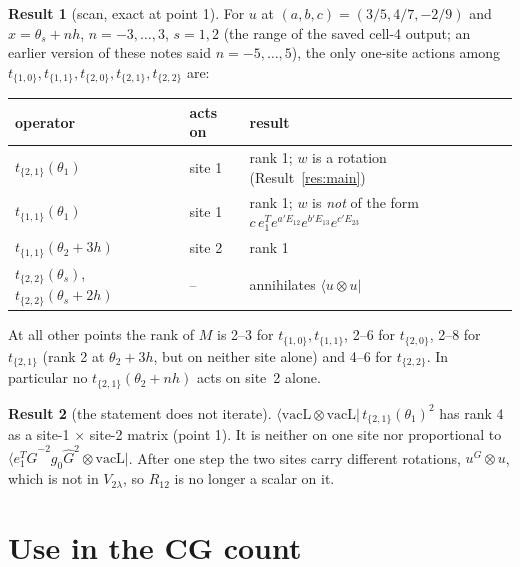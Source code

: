 \documentclass[11pt]{article}
\theoremstyle{definition}
\newtheorem{result}{Result}
\theoremstyle{remark}
\begin{document}
\begin{result}[scan, exact at point 1]\label{res:scan}
For $u$ at $(a,b,c)=(3/5,4/7,-2/9)$ and $x=\theta_s+nh$, $n=-3,\dots,3$, $s=1,2$ (the range of the saved cell-4 output; an earlier version of these notes said $n=-5,\dots,5$), the only one-site actions among $t_{\{1,0\}},t_{\{1,1\}},t_{\{2,0\}},t_{\{2,1\}},t_{\{2,2\}}$ are:
\begin{center}
\begin{tabular}{lll}\toprule
operator & acts on & result\\\midrule
$t_{\{2,1\}}(\theta_1)$ & site 1 & rank 1; $w$ is a rotation (Result~\ref{res:main})\\
$t_{\{1,1\}}(\theta_1)$ & site 1 & rank 1; $w$ is \emph{not} of the form $c\,e_1^Te^{a'E_{12}}e^{b'E_{13}}e^{c'E_{23}}$\\
$t_{\{1,1\}}(\theta_2+3h)$ & site 2 & rank 1\\
$t_{\{2,2\}}(\theta_s)$, $t_{\{2,2\}}(\theta_s+2h)$ & -- & annihilates $\langle u\otimes u|$\\\bottomrule
\end{tabular}
\end{center}
At all other points the rank of $M$ is 2--3 for $t_{\{1,0\}},t_{\{1,1\}}$, 2--6 for $t_{\{2,0\}}$, 2--8 for $t_{\{2,1\}}$ (rank 2 at $\theta_2+3h$, but on neither site alone) and 4--6 for $t_{\{2,2\}}$. In particular no $t_{\{2,1\}}(\theta_2+nh)$ acts on site~2 alone.
\end{result}

\begin{result}[the statement does not iterate]\label{res:iter}
$\langle\mathrm{vacL}\otimes\mathrm{vacL}|\,t_{\{2,1\}}(\theta_1)^2$ has rank 4 as a site-1 $\times$ site-2 matrix (point 1). It is neither on one site nor proportional to $\langle e_1^T\hat G^{-2}g_0\hat G^2\otimes\mathrm{vacL}|$. After one step the two sites carry different rotations, $u^G\otimes u$, which is not in $V_{2\lambda}$, so $R_{12}$ is no longer a scalar on it.
\end{result}

\section{Use in the CG count}
\end{document}
